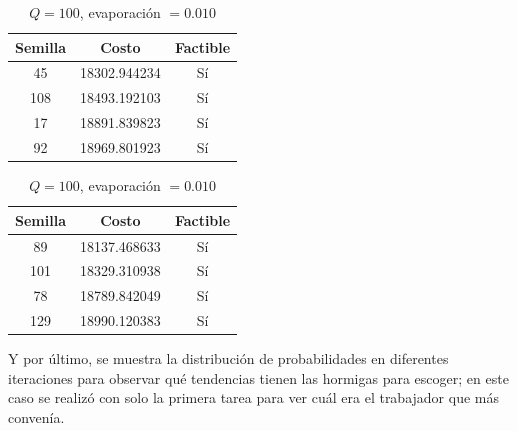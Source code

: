 \documentclass{article}
\begin{document}
    \begin{table}[H]
      \begin{minipage}{0.5\linewidth}
        \centering
        \caption{$Q=10$, evaporación $= 0.010$}
        \begin{tabular}{c c c}
          \hline
          Semilla & Costo & Factible   \\
          \hline
          45      & 18302.944234 & Sí \\
          108     & 18493.192103 & Sí \\
          17      & 18891.839823 & Sí \\
          92      & 18969.801923 & Sí \\
        \end{tabular}
      \end{minipage}
      \begin{minipage}{0.5\linewidth}
        \centering
        \caption{$Q=100$, evaporación $= 0.010$}
        \begin{tabular}{c c c}
          \hline
          Semilla & Costo & Factible   \\
          \hline
          89      & 18137.468633  & Sí  \\
          101     & 18329.310938  & Sí  \\
          78      & 18789.842049  & Sí  \\
          129     & 18990.120383  & Sí  \\
        \end{tabular}
      \end{minipage}
    \end{table}

    Y por último, se muestra la distribución de
    probabilidades en diferentes iteraciones 
    para observar qué tendencias tienen las 
    hormigas para escoger; en este caso se 
    realizó con solo la primera tarea para 
    ver cuál era el trabajador que más convenía.
\end{document}
